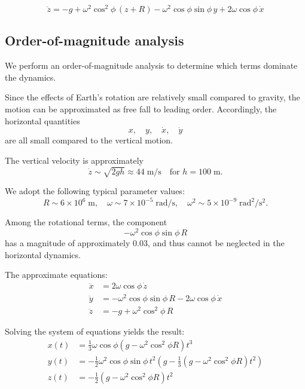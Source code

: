 \documentclass[11pt,en]{elegantpaper}
\begin{document}
\begin{equation} \label{eq:z}
\ddot{z} = -g + \omega^2 \cos^2\phi\, (z+R) - \omega^2 \cos\phi \sin\phi\, y + 2\omega \cos\phi\, \dot{x}
\end{equation}

\subsection{Order-of-magnitude analysis}

We perform an order-of-magnitude analysis to determine which terms dominate the dynamics.

Since the effects of Earth's rotation are relatively small compared to gravity,  
the motion can be approximated as free fall to leading order.  
Accordingly, the horizontal quantities
\begin{equation*}
x, \quad y, \quad \dot{x}, \quad \dot{y}
\end{equation*}
are all small compared to the vertical motion.


The vertical velocity is approximately
\[
\dot{z} \sim \sqrt{2gh} \approx 44\;\mathrm{m/s} \quad \text{for }h = 100\;\mathrm{m}.
\]

We adopt the following typical parameter values:
\[
R \sim 6 \times 10^6\;\mathrm{m}, \quad
\omega \sim 7 \times 10^{-5}\;\mathrm{rad/s}, \quad
\omega^2 \sim 5 \times 10^{-9}\;\mathrm{rad^2/s^2}.
\]

Among the rotational terms, the component
\[
-\omega^2 \cos\phi \sin\phi\, R
\]
has a magnitude of approximately \( 0.03 \),  
and thus cannot be neglected in the horizontal dynamics.


The approximate equations:
\begin{align}
	\ddot{x} &= 2\omega \cos\phi\, \dot{z} \\
	\ddot{y} &= -\omega^2 \cos\phi \sin\phi\, R - 2\omega \cos\phi\, \dot{x} \\
	\ddot{z} &= -g + \omega^2 \cos^2\phi\, R
\end{align}

Solving the system of equations yields the result:
\begin{align}
	x(t) &= \frac{1}{3} \omega \cos\phi \left(g - \omega^2 \cos^2\phi R\right) t^3 \\
	y(t) &= -\frac{1}{2} \omega^2 \cos\phi \sin\phi\, t^2 \left(g - \frac{1}{3}(g - \omega^2 \cos^2\phi R) t^2 \right) \\
	z(t) &= -\frac{1}{2} \left(g - \omega^2 \cos^2\phi R \right) t^2
\end{align}
\end{document}
